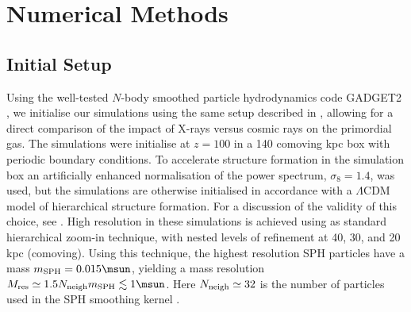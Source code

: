 \section{Numerical Methods}
\label{methods}

\subsection{Initial Setup}
\label{setup}

Using the well-tested $N$-body smoothed particle hydrodynamics code GADGET2 \citep{Springel2005}, we initialise our simulations using the same setup described in \citet{Hummeletal2014}, allowing for a direct comparison of the impact of X-rays versus cosmic rays on the primordial gas.  The simulations were initialise at $z=100$ in a 140 comoving kpc box with periodic boundary conditions. To accelerate structure formation in the simulation box an artificially enhanced normalisation of the power spectrum, $\sigma_8 = 1.4$, was used, but the simulations are otherwise initialised in accordance with a $\Lambda$CDM model of hierarchical structure formation. For a discussion of the validity of this choice, see \citet{StacyGreifBromm2010}. High resolution in these simulations is achieved using as standard hierarchical zoom-in technique, with nested levels of refinement at 40, 30, and 20 kpc (comoving).  Using this technique, the highest resolution SPH particles have a mass $m_{\rm SPH} = 0.015\msun$, yielding a mass resolution $M_{\rm res} \simeq 1.5 N_{\rm neigh} m_{\rm SPH} \lesssim 1\msun$.  Here $N_{\rm neigh} \simeq 32$ is the number of particles used in the SPH smoothing kernel \citep{BateBurkert1997}.
